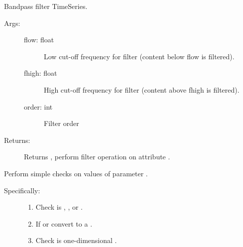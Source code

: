 \documentclass[letterpaper,10pt,english]{sphinxmanual}
\begin{document}
\begin{fulllineitems}
\begin{description}
\begin{description}
\end{description}

\end{description}


\begin{fulllineitems}
Bandpass filter TimeSeries.
\begin{description}
\item[{Args:}] \leavevmode\begin{description}
\item[{flow: float}] \leavevmode
Low cut-off frequency for filter (content below flow is 
filtered).

\item[{fhigh: float}] \leavevmode
High cut-off frequency for filter (content above fhigh is
filtered).

\item[{order: int}] \leavevmode
Filter order

\end{description}

\item[{Returns:}] \leavevmode
Returns , perform filter operation on attribute .

\end{description}

\end{fulllineitems}



\begin{fulllineitems}
Perform simple checks on values of parameter .
\begin{description}
\item[{Specifically:}] \leavevmode\begin{enumerate}
%
\item {} 
Check  is , , or .

\item {} 
If  or  convert to a .

\item {} 
Check  is one-dimensional .


\end{enumerate}
\end{description}
\end{fulllineitems}
\end{fulllineitems}
\end{document}
